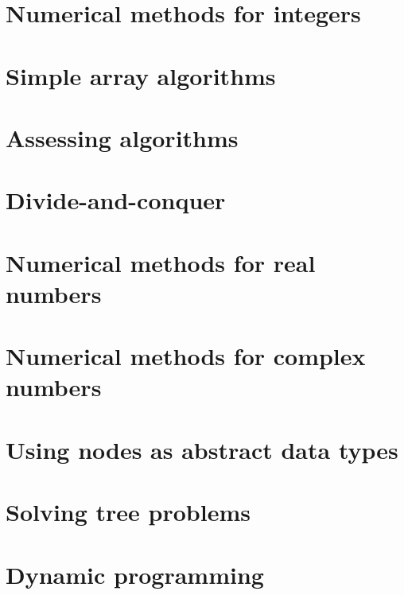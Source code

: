 \documentclass[oneside]{book}
\begin{document}
\part{Numerical methods for integers}




\part{Simple array algorithms}



\part{Assessing algorithms}



\part{Divide-and-conquer}


\part{Numerical methods for real numbers}







\part{Numerical methods for complex numbers}


\part{Using nodes as abstract data types}




\part{Solving tree problems}







\part{Dynamic programming}



\end{document}
